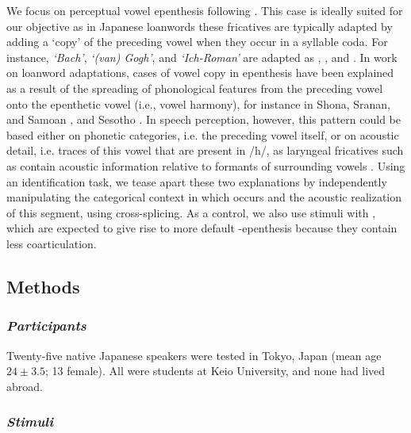 We focus on perceptual vowel epenthesis following . This case is ideally suited for our objective as in Japanese loanwords these fricatives are typically adapted by adding a `copy' of the preceding vowel when they occur in a syllable coda. For instance, \textit{`Bach'}, \textit{`(van) Gogh'}, and \textit{`Ich-Roman'} are adapted as , , and . In work on loanword adaptations, cases of vowel copy in epenthesis have been explained as a result of the spreading of phonological features from the preceding vowel onto the epenthetic vowel (i.e., vowel harmony), for instance in Shona, Sranan, and Samoan \cite{uffmann2006}, and Sesotho \cite{rose2006}. In speech perception, however, this pattern could be based either on phonetic categories, i.e. the preceding vowel itself, or on acoustic detail, i.e. traces of this vowel that are present in /h/, as laryngeal fricatives such as  contain acoustic information relative to formants of surrounding vowels \cite{keating1988}. Using an identification task, we tease apart these two explanations by independently manipulating the categorical context in which  occurs and the acoustic realization of this segment, using cross-splicing. As a control, we also use stimuli with , which are expected to give rise to more default -epenthesis because they contain less coarticulation. 

\subsection{Methods}

\subsubsection{\textit{Participants}}

Twenty-five native Japanese speakers were tested in Tokyo, Japan (mean age $24 \pm 3.5$; 13 female). All were students at Keio University, and none had lived abroad. 

\subsubsection{\textit{Stimuli}}

